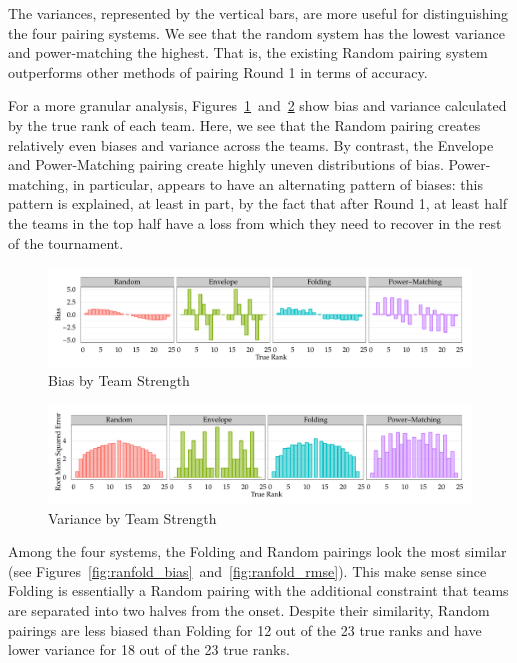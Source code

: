 \documentclass{tufte-handout}
\begin{document}
The variances, represented by the vertical bars, are more useful for distinguishing the four pairing systems. We see that the random system has the lowest variance and power-matching the highest. That is, the existing Random pairing system outperforms other methods of pairing Round 1 in terms of accuracy.

For a more granular analysis, Figures~\ref{fig:bias_teamRank}~and~\ref{fig:rmse_teamRank} show bias and variance calculated by the true rank of each team. Here, we see that the Random pairing creates relatively even biases and variance across the teams. By contrast, the Envelope and Power-Matching pairing create highly uneven distributions of bias. Power-matching, in particular, appears to have an alternating pattern of biases: this pattern is explained, at least in part, by the fact that after Round 1, at least half the teams in the top half have a loss from which they need to recover in the rest of the tournament. 

\begin{figure}[h]
  \includegraphics[width=\linewidth]{bias_teamRank.pdf}%
  \caption{Bias by Team Strength}%
  \label{fig:bias_teamRank}%
\end{figure}

\begin{figure}[h]
  \includegraphics[width=\linewidth]{rmse_teamRank.pdf}%
  \caption{Variance by Team Strength}%
    \label{fig:rmse_teamRank}%
\end{figure}

Among the four systems, the Folding and Random pairings look the most similar (see Figures~\ref{fig:ranfold_bias}~and~\ref{fig:ranfold_rmse}). This make sense since Folding is essentially a Random pairing with the additional constraint that teams are separated into two halves from the onset. Despite their similarity, Random pairings are less biased than Folding for 12 out of the 23 true ranks and have lower variance for 18 out of the 23 true ranks. 
\end{document}
